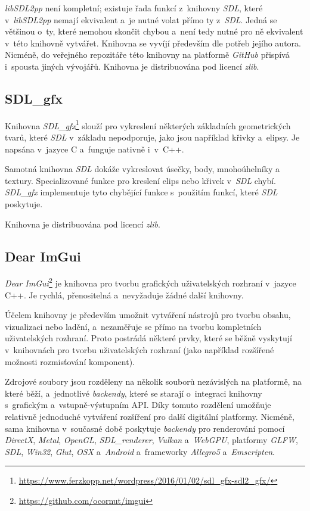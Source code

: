 \emph{libSDL2pp} není kompletní; existuje řada funkcí z~knihovny \emph{SDL}, které v~\emph{libSDL2pp} nemají ekvivalent a~je nutné volat přímo ty z~\emph{SDL}. Jedná se většinou o~ty, které nemohou skončit chybou a~není tedy nutné pro ně ekvivalent v~této knihovně vytvářet. Knihovna se vyvíjí především dle potřeb jejího autora. Nicméně, do veřejného repozitáře této knihovny na platformě \emph{GitHub} přispívá i~spousta jiných vývojářů. Knihovna je distribuována pod licencí \emph{zlib}.

\subsection*{SDL\_gfx}

Knihovna \emph{SDL\_gfx}\footnote{\url{https://www.ferzkopp.net/wordpress/2016/01/02/sdl_gfx-sdl2_gfx/}} slouží pro vykreslení některých základních geometrických tvarů, které \emph{SDL} v~základu nepodporuje, jako jsou například křivky a~elipsy. Je napsána v~jazyce C a~funguje nativně i~v~C++.

Samotná knihovna \emph{SDL} dokáže vykreslovat úsečky, body, mnohoúhelníky a textury. Specializované funkce pro kreslení elips nebo křivek v~\emph{SDL} chybí. \emph{SDL\_gfx} implementuje tyto chybějící funkce s~použitím funkcí, které \emph{SDL} poskytuje.

Knihovna je distribuována pod licencí \emph{zlib}.

\subsection*{Dear ImGui}

\emph{Dear ImGui}\footnote{\url{https://github.com/ocornut/imgui}} je knihovna pro tvorbu grafických uživatelských rozhraní v~jazyce C++. Je rychlá, přenositelná a~nevyžaduje žádné další knihovny.

Účelem knihovny je především umožnit vytváření nástrojů pro tvorbu obsahu, vizualizaci nebo ladění, a~nezaměřuje se přímo na tvorbu kompletních uživatelských rozhraní. Proto postrádá některé prvky, které se běžně vyskytují v~knihovnách pro tvorbu uživatelských rozhraní (jako například rozšířené možnosti rozmisťování komponent).

Zdrojové soubory jsou rozděleny na několik souborů nezávislých na platformě, na které běží, a~jednotlivé \emph{backendy}, které se starají o~integraci knihovny s~grafickým a~vstupně-výstupním API. Díky tomuto rozdělení umožňuje relativně jednoduché vytváření rozšíření pro další digitální platformy. Nicméně, sama knihovna v~současné době poskytuje \emph{backendy} pro renderování pomocí \emph{DirectX}, \emph{Metal}, \emph{OpenGL}, \emph{SDL\_renderer}, \emph{Vulkan} a~\emph{WebGPU}, platformy \emph{GLFW}, \emph{SDL}, \emph{Win32}, \emph{Glut}, \emph{OSX} a~\emph{Android} a~frameworky \emph{Allegro5} a~\emph{Emscripten}.

